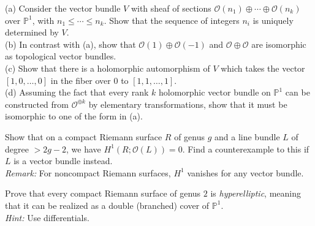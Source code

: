 \documentclass[12pt]{article}  %
\begin{document}
\begin{problem}[3]
(a) Consider the vector bundle $V$ with sheaf of sections $\mathcal{O}(n_1) \oplus \cdots \oplus \mathcal{O}(n_k)$ over $\mathbb{P}^1$, with $n_1 \le \cdots \le n_k$. Show that the sequence of integers $n_i$ is uniquely determined by $V$.\\
(b) In contrast with (a), show that $\mathcal{O}(1)\oplus\mathcal{O}(-1)$ and $\mathcal{O}\oplus\mathcal{O}$ are isomorphic as topological vector bundles.\\
(c) Show that there is a holomorphic automorphism of $V$ which takes the vector $[1,0,\dots,0]$ in the fiber over $0$ to $[1,1,\dots,1]$.\\
(d) Assuming the fact that every rank $k$ holomorphic vector bundle on $\mathbb{P}^1$ can be constructed from $\mathcal{O}^{\oplus k}$ by elementary transformations, show that it must be isomorphic to one of the form in (a).
\end{problem}

\begin{solution}
\end{solution}

\begin{problem}{4}
Show that on a compact Riemann surface $R$ of genus $g$ and a line bundle $L$ of degree $> 2g-2$, we have $H^1(R; \mathcal{O}(L)) = 0$. Find a counterexample to this if $L$ is a vector bundle instead.\\
\textit{Remark:} For noncompact Riemann surfaces, $H^1$ vanishes for any vector bundle.
\end{problem}

\begin{solution}
\end{solution}

\begin{problem}{5}
Prove that every compact Riemann surface of genus $2$ is \textit{hyperelliptic}, meaning that it can be realized as a double (branched) cover of $\mathbb{P}^1$.\\
\textit{Hint:} Use differentials.
\end{problem}

\begin{solution}
\end{solution}
\end{document}
